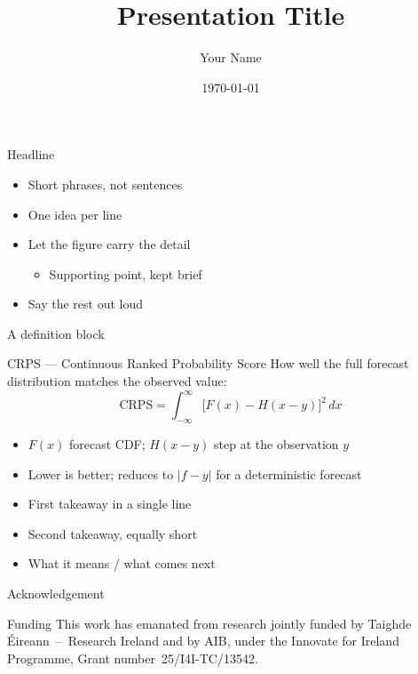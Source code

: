 \documentclass[aspectratio=169,t]{beamer}
\title{Presentation Title}
\author{Your Name}
\date{\today}
\begin{document}
\maketitleframe

\begin{frame}{Headline}
  \begin{itemize}
    \item Short phrases, not sentences
    \item One idea per line
    \item Let the figure carry the detail
    \begin{itemize}
      \item Supporting point, kept brief
    \end{itemize}
    \item Say the rest out loud
  \end{itemize}
\end{frame}

\begin{frame}{A definition block}
  \begin{block}{CRPS --- Continuous Ranked Probability Score}
    How well the full forecast distribution matches the observed value:
    \[
      \mathrm{CRPS} = \int_{-\infty}^{\infty}\bigl[F(x) - H(x-y)\bigr]^2\,dx
    \]
    \begin{itemize}
      \item $F(x)$ forecast CDF; \; $H(x-y)$ step at the observation $y$
      \item Lower is better; reduces to $|f-y|$ for a deterministic forecast
    \end{itemize}
  \end{block}
\end{frame}

\begin{conclusions}[Conclusions]
  \begin{itemize}
    \item First takeaway in a single line
    \item Second takeaway, equally short
    \item What it means / what comes next
  \end{itemize}
\end{conclusions}

\begin{frame}{Acknowledgement}
  \vspace{1.5em}
  \begin{block}{Funding}
    This work has emanated from research jointly funded by Taighde
    Éireann~--~Research Ireland and by AIB, under the Innovate for Ireland
    Programme, Grant number~25/I4I-TC/13542.
  \end{block}
\end{frame}
\end{document}

